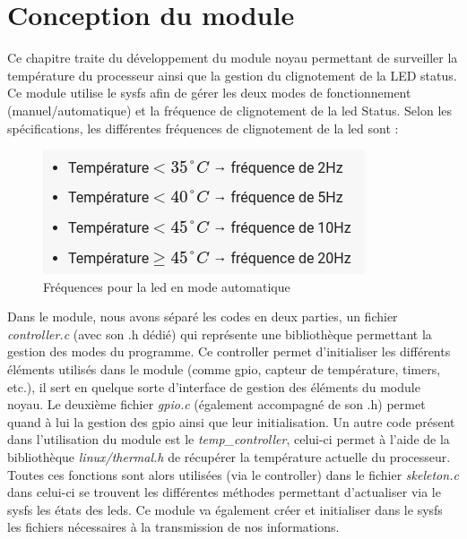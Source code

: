 \documentclass{ReportTemplate}
\begin{document}
\chapter{Conception du module}
Ce chapitre traite du développement du module noyau permettant de surveiller la
température du processeur ainsi que la gestion du clignotement de la LED status.
Ce module utilise le sysfs afin de gérer les deux modes de fonctionnement
(manuel/automatique) et la fréquence de clignotement de la led Status. Selon les
spécifications, les différentes fréquences de clignotement de la led sont :
\begin{figure}[H]
    \includegraphics[width= \textwidth]{imageSources/Led_Frequencies.png}
    \caption{Fréquences pour la led en mode automatique}
    \label{fig:ledFrequencies}
\end{figure}
Dans le module, nous avons séparé les codes en deux parties, un fichier
\textit{controller.c} (avec son .h dédié) qui représente une bibliothèque
permettant la gestion des modes du programme. Ce controller permet d'initialiser
les différents éléments utilisés dans le module (comme gpio, capteur de
température, timers, etc.), il sert en quelque sorte d'interface de gestion des
éléments du module noyau.\newline
Le deuxième fichier \textit{gpio.c} (également accompagné de son .h) permet quand à lui la gestion
des gpio ainsi que leur initialisation.\newline
Un autre code présent dans l'utilisation du module est le
\textit{temp\_controller}, celui-ci permet à l'aide de la bibliothèque
\textit{linux/thermal.h} de récupérer la température actuelle du
processeur.\newline
Toutes ces fonctions sont alors utilisées (via le controller) dans le fichier
\textit{skeleton.c} dans celui-ci se trouvent les différentes méthodes
permettant d'actualiser via le sysfs les états des leds.\newline
Ce module va également créer et initialiser dans le sysfs les fichiers
nécessaires à la transmission de nos informations.
\end{document}
